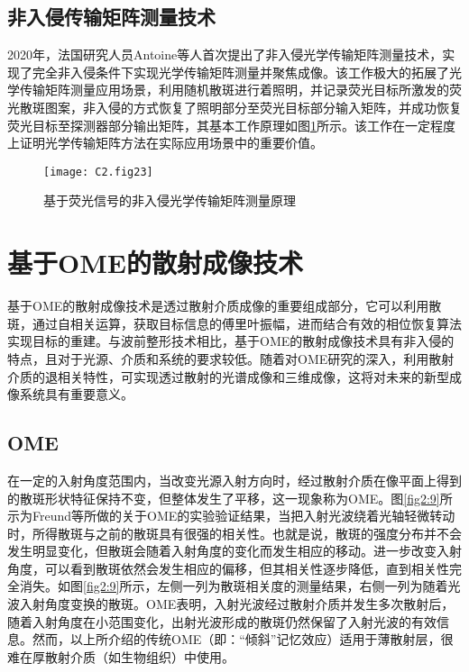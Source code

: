 \subsection{非入侵传输矩阵测量技术}

2020年，法国研究人员Antoine等\cite{boniface_non_invasive_2020}人首次提出了非入侵光学传输矩阵测量技术，实现了完全非入侵条件下实现光学传输矩阵测量并聚焦成像。该工作极大的拓展了光学传输矩阵测量应用场景，利用随机散斑进行着照明，并记录荧光目标所激发的荧光散斑图案，非入侵的方式恢复了照明部分至荧光目标部分输入矩阵，并成功恢复荧光目标至探测器部分输出矩阵，其基本工作原理如图\ref{fig2:23}所示\cite{boniface_non_invasive_2020}。该工作在一定程度上证明光学传输矩阵方法在实际应用场景中的重要价值。

\begin{figure}[htp]
	\centering
	\texttt{[image: C2.fig23]}
	\caption{基于荧光信号的非入侵光学传输矩阵测量原理}
	\label{fig2:23}
\end{figure}


\section{基于OME的散射成像技术}

基于OME的散射成像技术是透过散射介质成像的重要组成部分，它可以利用散斑，通过自相关运算，获取目标信息的傅里叶振幅，进而结合有效的相位恢复算法实现目标的重建。与波前整形技术相比，基于OME的散射成像技术具有非入侵的特点，且对于光源、介质和系统的要求较低。随着对OME研究的深入，利用散射介质的退相关特性，可实现透过散射的光谱成像\cite{park_multispectral_2013,stewart_toward_2017}和三维成像\cite{Pegard2016,holekamp_fast_2008}，这将对未来的新型成像系统具有重要意义。

\subsection{OME}

在一定的入射角度范围内，当改变光源入射方向时，经过散射介质在像平面上得到的散斑形状特征保持不变，但整体发生了平移，这一现象称为OME。图\ref{fig2:9}所示为Freund等\cite{Freund1988}所做的关于OME的实验验证结果，当把入射光波绕着光轴轻微转动时，所得散斑与之前的散斑具有很强的相关性。也就是说，散斑的强度分布并不会发生明显变化，但散斑会随着入射角度的变化而发生相应的移动。进一步改变入射角度，可以看到散斑依然会发生相应的偏移，但其相关性逐步降低，直到相关性完全消失。如图\ref{fig2:9}所示，左侧一列为散斑相关度的测量结果，右侧一列为随着光波入射角度变换的散斑。OME表明，入射光波经过散射介质并发生多次散射后，随着入射角度在小范围变化，出射光波形成的散斑仍然保留了入射光波的有效信息。然而，以上所介绍的传统OME（即：“倾斜”记忆效应）适用于薄散射层，很难在厚散射介质（如生物组织）中使用。

